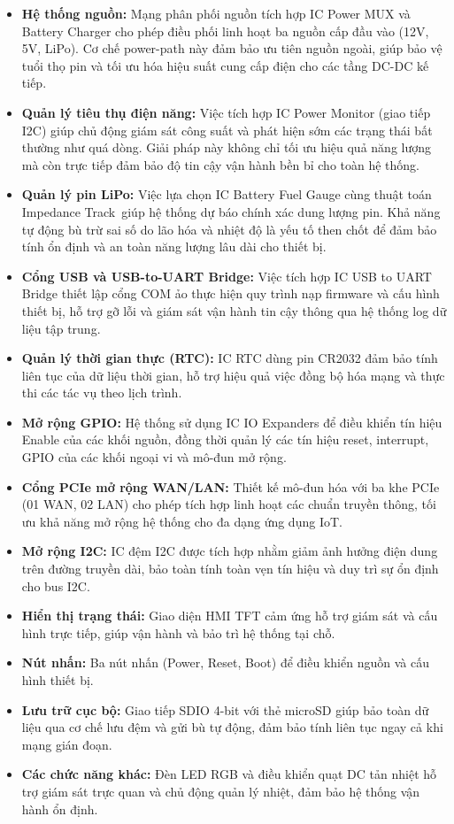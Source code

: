             \begin{itemize}
                \item \textbf{Hệ thống nguồn:} Mạng phân phối nguồn tích hợp IC Power MUX và Battery Charger cho phép điều phối linh hoạt ba nguồn cấp đầu vào (12V, 5V, LiPo). Cơ chế power-path này đảm bảo ưu tiên nguồn ngoài, giúp bảo vệ tuổi thọ pin và tối ưu hóa hiệu suất cung cấp điện cho các tầng DC-DC kế tiếp.
                \item \textbf{Quản lý tiêu thụ điện năng:} Việc tích hợp IC Power Monitor (giao tiếp I2C) giúp chủ động giám sát công suất và phát hiện sớm các trạng thái bất thường như quá dòng. Giải pháp này không chỉ tối ưu hiệu quả năng lượng mà còn trực tiếp đảm bảo độ tin cậy vận hành bền bỉ cho toàn hệ thống.
                \item \textbf{Quản lý pin LiPo:} Việc lựa chọn IC Battery Fuel Gauge cùng thuật toán Impedance Track\texttrademark\ giúp hệ thống dự báo chính xác dung lượng pin. Khả năng tự động bù trừ sai số do lão hóa và nhiệt độ là yếu tố then chốt để đảm bảo tính ổn định và an toàn năng lượng lâu dài cho thiết bị.
                \item \textbf{Cổng USB và USB-to-UART Bridge:} Việc tích hợp IC USB to UART Bridge thiết lập cổng COM ảo thực hiện quy trình nạp firmware và cấu hình thiết bị, hỗ trợ gỡ lỗi và giám sát vận hành tin cậy thông qua hệ thống log dữ liệu tập trung.
                \item \textbf{Quản lý thời gian thực (RTC):} IC RTC dùng pin CR2032 đảm bảo tính liên tục của dữ liệu thời gian, hỗ trợ hiệu quả việc đồng bộ hóa mạng và thực thi các tác vụ theo lịch trình.
                \item \textbf{Mở rộng GPIO:} Hệ thống sử dụng IC IO Expanders để điều khiển tín hiệu Enable của các khối nguồn, đồng thời quản lý các tín hiệu reset, interrupt, GPIO của các khối ngoại vi và mô-đun mở rộng.
                \item \textbf{Cổng PCIe mở rộng WAN/LAN:} Thiết kế mô-đun hóa với ba khe PCIe (01 WAN, 02 LAN) cho phép tích hợp linh hoạt các chuẩn truyền thông, tối ưu khả năng mở rộng hệ thống cho đa dạng ứng dụng IoT.
                \item \textbf{Mở rộng I2C:} IC đệm I2C được tích hợp nhằm giảm ảnh hưởng điện dung trên đường truyền dài, bảo toàn tính toàn vẹn tín hiệu và duy trì sự ổn định cho bus I2C.
                \item \textbf{Hiển thị trạng thái:} Giao diện HMI TFT cảm ứng hỗ trợ giám sát và cấu hình trực tiếp, giúp vận hành và bảo trì hệ thống tại chỗ.
                \item \textbf{Nút nhấn:} Ba nút nhấn (Power, Reset, Boot) để điều khiển nguồn và cấu hình thiết bị.
                \item \textbf{Lưu trữ cục bộ:} Giao tiếp SDIO 4-bit với thẻ microSD giúp bảo toàn dữ liệu qua cơ chế lưu đệm và gửi bù tự động, đảm bảo tính liên tục ngay cả khi mạng gián đoạn.
                \item \textbf{Các chức năng khác:} Đèn LED RGB và điều khiển quạt DC tản nhiệt hỗ trợ giám sát trực quan và chủ động quản lý nhiệt, đảm bảo hệ thống vận hành ổn định.
            \end{itemize}

